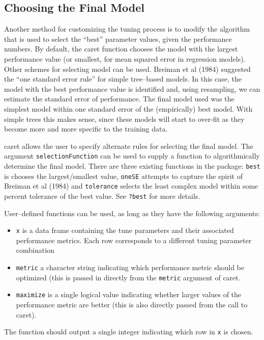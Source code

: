 \documentclass[12pt]{article}
\newcommand{\code}[1]{\mbox{\footnotesize\color{darkblue}\texttt{#1}}}
\newcommand{\pkg}[1]{{\fontseries{b}\selectfont #1}}
\renewcommand{\pkg}[1]{{\textsf{#1}}}
\begin{document}
\subsection{Choosing the Final Model}\label{S:finalMod}

Another method for customizing the tuning process is to modify the
algorithm that is used to select the ``best'' parameter values, given
the performance numbers. By default, the \pkg{caret} function
chooses the model with the largest performance value (or smallest, for
mean squared error in regression models). Other schemes for selecting
model can be used.  Breiman et al (1984) suggested the ``one standard
error rule'' for simple tree--based models. In this case, the model
with the best performance value is identified and, using resampling,
we can estimate the standard error of performance. The final model
used was the simplest model within one standard error of the
(empirically) best model. With simple trees this makes sense, since
these models will start to over-fit as they become more and more
specific to the training data. 

\pkg{caret} allows the user to specify alternate rules for
selecting the final model. The argument \code{selectionFunction}
can be used to supply a function to algorithmically determine the
final model. There are three existing functions in the package:
\code{best} is chooses the largest/smallest value, \code{oneSE}
attempts to capture the spirit of Breiman et al (1984) and
\code{tolerance} selects the least complex model within some percent
tolerance of the best value. See \code{?best} for more details. 

User--defined functions can be used, as long as they have the
following arguments: 
\begin{itemize}
  \item \code{x} is a data frame containing the tune parameters and
    their associated performance metrics. Each row corresponds to a
    different tuning parameter combination 
    \item \code{metric} a character string indicating which
      performance metric should be optimized (this is passed in
      directly from the \code{metric} argument of \pkg{caret}.  
      \item \code{maximize} is a single logical value indicating
        whether larger values of the performance metric are better
        (this is also directly passed from the call to
        \pkg{caret}). 
  \end{itemize}
  The function should output a single integer indicating which row in
  \code{x} is chosen. 
\end{document}
